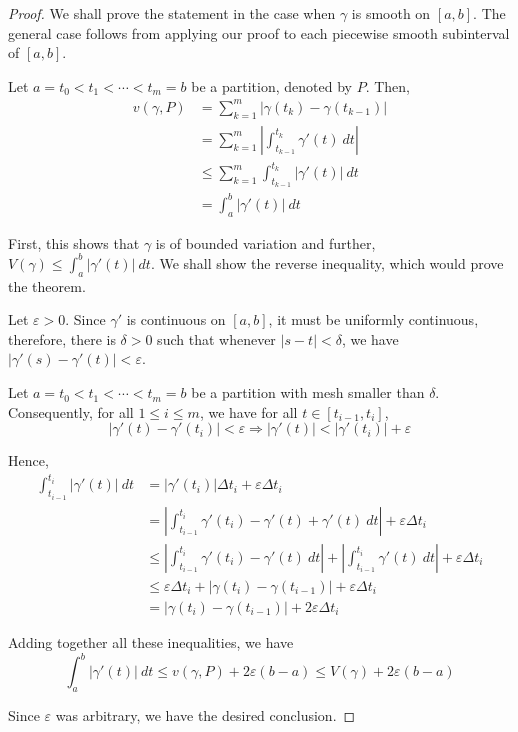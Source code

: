 \begin{proof}
    We shall prove the statement in the case when $\gamma$ is smooth on $[a,b]$. The general case follows from applying our proof to each piecewise smooth subinterval of $[a,b]$. 

    Let $a = t_0 < t_1 < \cdots < t_m = b$ be a partition, denoted by $P$. Then, 
    \begin{align*}
        v(\gamma, P) &= \sum_{k = 1}^m |\gamma(t_k) - \gamma(t_{k - 1})|\\
        &= \sum_{k = 1}^m\left|\int_{t_{k - 1}}^{t_k}\gamma'(t)~dt\right|\\
        &\le\sum_{k = 1}^m\int_{t_{k - 1}}^{t_k}|\gamma'(t)|~dt\\
        &=\int_a^b|\gamma'(t)|~dt
    \end{align*}

    First, this shows that $\gamma$ is of bounded variation and further, $V(\gamma)\le\int_a^b|\gamma'(t)|~dt$. We shall show the reverse inequality, which would prove the theorem. 

    Let $\varepsilon > 0$. Since $\gamma'$ is continuous on $[a,b]$, it must be uniformly continuous, therefore, there is $\delta > 0$ such that whenever $|s - t| < \delta$, we have $|\gamma'(s) - \gamma'(t)| < \varepsilon$.

    Let $a = t_0 < t_1 < \cdots < t_m = b$ be a partition with mesh smaller than $\delta$. Consequently, for all $1\le i\le m$, we have for all $t\in [t_{i - 1}, t_i]$,
    \begin{equation*}
        |\gamma'(t) - \gamma'(t_i)| < \varepsilon\Longrightarrow |\gamma'(t)| < |\gamma'(t_i)| + \varepsilon
    \end{equation*}

    Hence, 
    \begin{align*}
        \int_{t_{i - 1}}^{t_i}|\gamma'(t)|~dt &= |\gamma'(t_i)|\Delta t_i + \varepsilon\Delta t_i\\
        &=\left|\int_{t_{i - 1}}^{t_i}\gamma'(t_i) - \gamma'(t) + \gamma'(t)~dt\right| + \varepsilon\Delta t_i\\
        &\le\left|\int_{t_{i - 1}}^{t_i}\gamma'(t_i) - \gamma'(t)~dt\right| + \left|\int_{t_{i - 1}}^{t_i}\gamma'(t)~dt\right| + \varepsilon\Delta t_i\\
        &\le\varepsilon\Delta t_i + |\gamma(t_i) - \gamma(t_{i - 1})| + \varepsilon\Delta t_i\\
        &= \left|\gamma(t_i) - \gamma(t_{i - 1})\right| + 2\varepsilon\Delta t_i
    \end{align*}

    Adding together all these inequalities, we have 
    \begin{equation*}
        \int_a^b|\gamma'(t)|~dt\le v(\gamma, P) + 2\varepsilon(b - a)\le V(\gamma) + 2\varepsilon(b - a)
    \end{equation*}

    Since $\varepsilon$ was arbitrary, we have the desired conclusion.
\end{proof}

